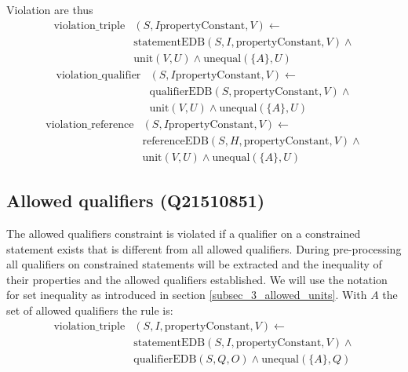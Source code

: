 \documentclass[hyperref,bachelorofscience,fleqn]{cgvpub}
\begin{document}
Violation are thus
\begin{equation*}
\begin{split}
\text{violation\_triple}&(S, I \text{propertyConstant}, V) \leftarrow \\
&\text{statementEDB}(S, I, \text{propertyConstant}, V) \wedge{} \\
&\text{unit}(V, U) \wedge \text{unequal}(\{A\}, U)
\end{split}
\end{equation*}
\begin{equation*}
\begin{split}
\text{violation\_qualifier}&(S, I \text{propertyConstant}, V) \leftarrow \\
&\text{qualifierEDB}(S, \text{propertyConstant}, V) \wedge{} \\
&\text{unit}(V, U) \wedge \text{unequal}(\{A\}, U)
\end{split}
\end{equation*}
\begin{equation*}
\begin{split}
\text{violation\_reference}&(S, I \text{propertyConstant}, V) \leftarrow \\
&\text{referenceEDB}(S, H, \text{propertyConstant}, V) \wedge{} \\
&\text{unit}(V, U) \wedge \text{unequal}(\{A\}, U)
\end{split}
\end{equation*}

\subsection{Allowed qualifiers (Q21510851)}
The allowed qualifiers constraint is violated if a qualifier on a constrained statement exists that is different from all allowed qualifiers. During pre-processing all qualifiers on constrained statements will be extracted and the inequality of their properties and the allowed qualifiers established. We will use the notation for set inequality as introduced in section \ref{subsec_3_allowed_units}. With \(A\) the set of allowed qualifiers the rule is:
\begin{equation*}
\begin{split}
\text{violation\_triple}&(S, I, \text{propertyConstant}, V) \leftarrow \\
&\text{statementEDB}(S, I, \text{propertyConstant}, V) \wedge{} \\
&\text{qualifierEDB}(S, Q, O) \wedge \text{unequal}(\{A\}, Q)
\end{split}
\end{equation*}
\end{document}
